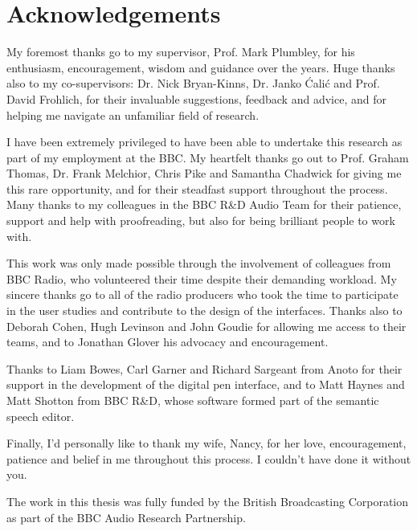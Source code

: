\chapter*{Acknowledgements}

My foremost thanks go to my supervisor, Prof. Mark Plumbley, for his enthusiasm, encouragement, wisdom and guidance over
the years. Huge thanks also to my co-supervisors: Dr. Nick Bryan-Kinns, Dr. Janko \'{C}ali\'{c} and Prof.  David
Frohlich, for their invaluable suggestions, feedback and advice, and for helping me navigate an unfamiliar field of
research.

I have been extremely privileged to have been able to undertake this research as part of my employment at the BBC.  My
heartfelt thanks go out to Prof. Graham Thomas, Dr. Frank Melchior, Chris Pike and Samantha Chadwick for giving me this
rare opportunity, and for their steadfast support throughout the process.  Many thanks to my colleagues in the BBC R\&D
Audio Team for their patience, support and help with proofreading, but also for being brilliant people to work with.

This work was only made possible through the involvement of colleagues from BBC Radio, who volunteered their time
despite their demanding workload. My sincere thanks go to all of the radio producers who took the time to participate
in the user studies and contribute to the design of the interfaces. Thanks also to Deborah Cohen, Hugh Levinson and
John Goudie for allowing me access to their teams, and to Jonathan Glover his advocacy and encouragement.

Thanks to Liam Bowes, Carl Garner and Richard Sargeant from Anoto for their support in the development of the digital
pen interface, and to Matt Haynes and Matt Shotton from BBC R\&D, whose software formed part of the semantic speech
editor.

Finally, I'd personally like to thank my wife, Nancy, for her love, encouragement, patience and belief in me throughout
this process. I couldn't have done it without you.

\vfill
\noindent
The work in this thesis was fully funded by the British Broadcasting Corporation as part of the BBC Audio Research
Partnership.
